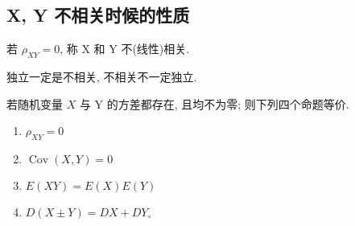 \subsection{X, Y 不相关时候的性质}

若 $\rho_{X Y}=0$, 称 X 和 Y 不(线性)相关. 

\begin{corollary}
    独立一定是不相关, 不相关不一定独立. 
\end{corollary}

\begin{theorem}
    若随机变量 $X$ 与 Y 的方差都存在, 且均不为零; 则下列四个命题等价. 
    \begin{enumerate}
        \item $\rho_{X Y}=0$
        \item $\operatorname{Cov}(X, Y)=0$
        \item $E(X Y)=E (X) E (Y)$
        \item $D(X \pm Y)=D X+D Y_{\circ}$
    \end{enumerate}
\end{theorem}
